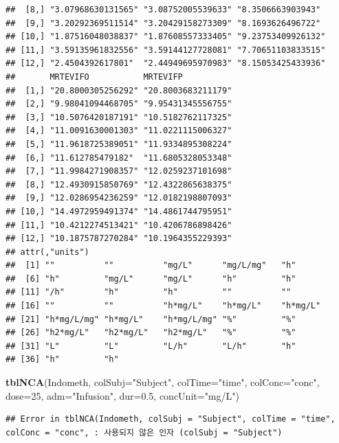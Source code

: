 \documentclass[]{krantz}
\makeatletter
\newenvironment{Shaded}{\begin{snugshade}}{\end{snugshade}}
\newcommand{\KeywordTok}[1]{\textcolor[rgb]{0.13,0.29,0.53}{\textbf{#1}}}
\newcommand{\DataTypeTok}[1]{\textcolor[rgb]{0.13,0.29,0.53}{#1}}
\newcommand{\DecValTok}[1]{\textcolor[rgb]{0.00,0.00,0.81}{#1}}
\newcommand{\FloatTok}[1]{\textcolor[rgb]{0.00,0.00,0.81}{#1}}
\newcommand{\StringTok}[1]{\textcolor[rgb]{0.31,0.60,0.02}{#1}}
\newcommand{\NormalTok}[1]{#1}
\newenvironment{kframe}{%
\medskip{}
\setlength{\fboxsep}{.8em}
 \def\at@end@of@kframe{}%
 \ifinner\ifhmode%
  \def\at@end@of@kframe{\end{minipage}}%
  \begin{minipage}{\columnwidth}%
 \fi\fi%
 \def\FrameCommand##1{\hskip\@totalleftmargin \hskip-\fboxsep
 \colorbox{shadecolor}{##1}\hskip-\fboxsep
     \hskip-\linewidth \hskip-\@totalleftmargin \hskip\columnwidth}%
 \MakeFramed {\advance\hsize-\width
   \@totalleftmargin\z@ \linewidth\hsize
   \@setminipage}}%
 {\par\unskip\endMakeFramed%
 \at@end@of@kframe}
\renewenvironment{Shaded}{\begin{kframe}}{\end{kframe}}
\theoremstyle{definition}
\theoremstyle{definition}
\theoremstyle{definition}
\theoremstyle{remark}
\makeatother
\begin{document}
\begin{verbatim}
##  [8,] "3.07968630131565" "3.08752005539633" "8.3506663903943" 
##  [9,] "3.20292369511514" "3.20429158273309" "8.1693626496722" 
## [10,] "1.87516048038837" "1.87608557333405" "9.23753409926132"
## [11,] "3.59135961832556" "3.59144127728081" "7.70651103833515"
## [12,] "2.4504392617801"  "2.44949695970983" "8.15053425433936"
##       MRTEVIFO           MRTEVIFP          
##  [1,] "20.8000305256292" "20.8003683211179"
##  [2,] "9.98041094468705" "9.95431345556755"
##  [3,] "10.5076420187191" "10.5182762117325"
##  [4,] "11.0091630001303" "11.0221115006327"
##  [5,] "11.9618725389051" "11.9334895308224"
##  [6,] "11.612785479182"  "11.6805328053348"
##  [7,] "11.9984271908357" "12.0259237101698"
##  [8,] "12.4930915850769" "12.4322865638375"
##  [9,] "12.0286954236259" "12.0182198807093"
## [10,] "14.4972959491374" "14.4861744795951"
## [11,] "10.4212274513421" "10.4206786898426"
## [12,] "10.1875787270284" "10.1964355229393"
## attr(,"units")
##  [1] ""          ""          "mg/L"      "mg/L/mg"   "h"        
##  [6] "h"         "mg/L"      "mg/L"      "h"         "h"        
## [11] "/h"        "h"         "h"         ""          ""         
## [16] ""          ""          "h*mg/L"    "h*mg/L"    "h*mg/L"   
## [21] "h*mg/L/mg" "h*mg/L"    "h*mg/L/mg" "%"         "%"        
## [26] "h2*mg/L"   "h2*mg/L"   "h2*mg/L"   "%"         "%"        
## [31] "L"         "L"         "L/h"       "L/h"       "h"        
## [36] "h"         "h"
\end{verbatim}

\begin{Shaded}
\begin{Highlighting}[]
\KeywordTok{tblNCA}\NormalTok{(Indometh, }\DataTypeTok{colSubj=}\StringTok{"Subject"}\NormalTok{, }\DataTypeTok{colTime=}\StringTok{"time"}\NormalTok{, }\DataTypeTok{colConc=}\StringTok{"conc"}\NormalTok{, }\DataTypeTok{dose=}\DecValTok{25}\NormalTok{,}
       \DataTypeTok{adm=}\StringTok{"Infusion"}\NormalTok{, }\DataTypeTok{dur=}\FloatTok{0.5}\NormalTok{, }\DataTypeTok{concUnit=}\StringTok{"mg/L"}\NormalTok{)}
\end{Highlighting}
\end{Shaded}

\begin{verbatim}
## Error in tblNCA(Indometh, colSubj = "Subject", colTime = "time", colConc = "conc", : 사용되지 않은 인자 (colSubj = "Subject")
\end{verbatim}
\end{document}
